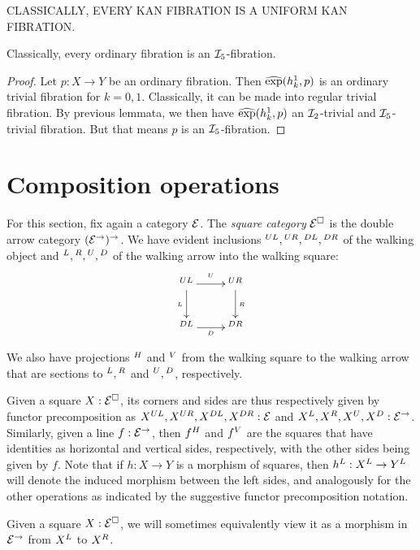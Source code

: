 \documentclass[reqno,10pt,a4paper,oneside]{amsart}
\begin{document}
CLASSICALLY, EVERY KAN FIBRATION IS A UNIFORM KAN FIBRATION.

\begin{lemma}
Classically, every ordinary fibration is an $\cal{I}_5$-fibration.
\end{lemma}

\begin{proof}
Let $p : X \to Y$ be an ordinary fibration.
Then $\hatexp(h_k^1, p)$ is an ordinary trivial fibration for $k = 0, 1$.
Classically, it can be made into regular trivial fibration.
By previous lemmata, we then have $\hatexp(h_k^1, p)$ an $\cal{I}_2$-trivial and $\cal{I}_5$-trivial fibration.
But that means $p$ is an $\cal{I}_5$-fibration.
\end{proof}



\section{Composition operations} 



For this section, fix again a category $\catE$.
The \emph{square category} $\catE^{\Box}$ is the double arrow category $(\catE^{\to})^{\to}$.
We have evident inclusions $\squl, \squr, \sqdl, \sqdr$ of the walking object and $\sql, \sqr, \squ, \sqd$ of the walking arrow into the walking square:
\[
\xymatrix{
  \squl
  \ar[r]^{\squ}
  \ar[d]_{\sql}
  \ar@{}[dr]
&
  \squr
  \ar[d]^{\sqr}
\\
  \sqdl
  \ar[r]_{\sqd}
&
  \sqdr
}
\]
We also have projections $\sqhori$ and $\sqvert$ from the walking square to the walking arrow that are sections to $\sql, \sqr$ and $\squ, \sqd$, respectively.

Given a square $X : \catE^{\Box}$, its corners and sides are thus respectively given by functor precomposition as $X\squl, X\squr, X\sqdl, X\sqdr : \catE$ and $X\sql, X\sqr, X\squ, X\sqd : \catE^{\to}$.
Similarly, given a line $f : \catE^{\to}$, then $f\sqhori$ and $f\sqvert$ are the squares that have identities as horizontal and vertical sides, respectively, with the other sides being given by $f$.
Note that if $h : X \to Y$ is a morphism of squares, then \eg $h\sql : X\sql \to Y\sql$ will denote the induced morphism between the left sides, and analogously for the other operations as indicated by the suggestive functor precomposition notation.

Given a square $X : \catE^{\Box}$, we will sometimes equivalently view it as a morphism in $\catE^{\to}$ from $X\sql$ to $X\sqr$.
\end{document}
